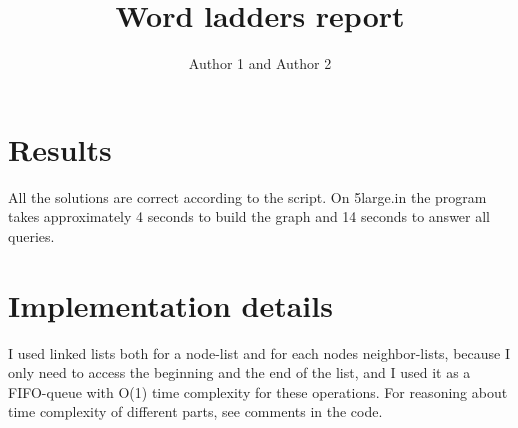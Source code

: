 \documentclass{article}
\title{Word ladders report}
\author{Author 1 and Author 2}
\begin{document}
  \maketitle

  \section{Results}

   All the solutions are correct according to the script.
   On 5large.in the program takes approximately 4 seconds to build the graph and 14 seconds to answer all queries.

  \section{Implementation details}

  I used linked lists both for a node-list and for each nodes neighbor-lists, because I only need to access the beginning and the end of the list, and I used it as a FIFO-queue
  with O(1) time complexity for these operations.
  For reasoning about time complexity of different parts, see comments in the code.
\end{document}
